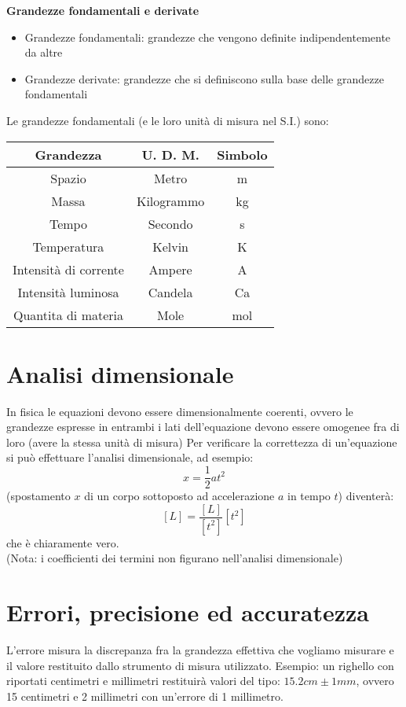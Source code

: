 \documentclass[a4paper,12pt]{article}
\begin{document}
\textbf{Grandezze fondamentali e derivate}
\begin{itemize}
  \item Grandezze fondamentali:
    grandezze che vengono definite indipendentemente da altre
  \item Grandezze derivate:
    grandezze che si definiscono sulla base delle grandezze fondamentali
\end{itemize}

Le grandezze fondamentali (e le loro unità di misura nel S.I.) sono:
\begin{center}
\begin{tabular}{|c|c|c|}
  Grandezza & U. D. M. & Simbolo \\
  \hline
  Spazio & Metro & m \\
  \hline
  Massa & Kilogrammo & kg \\
  \hline
  Tempo & Secondo & s \\ 
  \hline
  Temperatura & Kelvin & K \\
  \hline
  Intensità di corrente & Ampere & A \\
  \hline
  Intensità luminosa & Candela & Ca \\
  \hline
  Quantita di materia & Mole & mol \\
\end{tabular}
\end{center}

\section{Analisi dimensionale}
In fisica le equazioni devono essere dimensionalmente coerenti, ovvero le grandezze espresse in entrambi i lati
dell'equazione devono essere omogenee fra di loro (avere la stessa unità di misura)
Per verificare la correttezza di un'equazione si può effettuare l'analisi dimensionale, ad esempio:
$$ x = \frac{1}{2}at^2 $$ (spostamento $x$ di un corpo sottoposto ad accelerazione $a$ in tempo $t$) diventerà:
$$ [L] = \frac{[L]}{[t^2]}[t^2] $$ che è chiaramente vero. \\
(Nota: i coefficienti dei termini non figurano nell'analisi dimensionale)

\newpage

\section{Errori, precisione ed accuratezza}
L'errore misura la discrepanza fra la grandezza effettiva che vogliamo misurare e il valore restituito dallo
strumento di misura utilizzato. Esempio: un righello con riportati centimetri e millimetri restituirà valori
del tipo: $ 15.2cm \pm 1mm $, ovvero 15 centimetri e 2 millimetri con un'errore di 1 millimetro.
\end{document}
